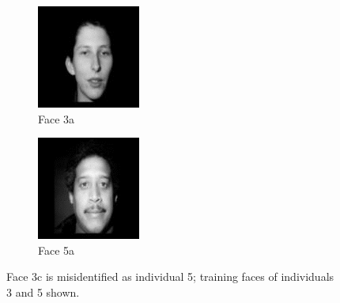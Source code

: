 \begin{figure}[ht]
\begin{subfigure}[b]{0.2\textwidth}
    \includegraphics[width=\textwidth]{images/q3_face_3a.png}
    \caption{Face 3a}
  \end{subfigure}
  \hspace{3em}
  \begin{subfigure}[b]{0.2\textwidth}
    \centering
    \includegraphics[width=\textwidth]{images/q3_face_5a.png}
    \caption{Face 5a}
  \end{subfigure}
  \caption{Face 3c is misidentified as individual 5; training faces of individuals 3 and 5 shown.}
  \label{fig:misidentification}
\end{figure}

